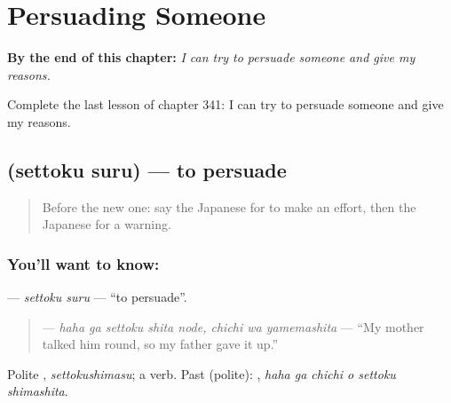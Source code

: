 
\chapter{Persuading Someone}
\label{ch:ja-persuading-someone}

\begin{chapteropening}
\textbf{By the end of this chapter:} \emph{I can try to persuade someone and give my reasons.}

Complete the last lesson of chapter 341: I can try to persuade someone and give my reasons.
\end{chapteropening}

\section[\texorpdfstring{\ja{せっとくする} (settoku suru)}{せっとくする (settoku suru)}]{ (settoku suru) — to persuade}

\label{lesson:JA-C341-settoku-suru}



\begin{quote}
Before the new one: say the Japanese for to make an effort, then the Japanese for a warning.
\end{quote}

\subsection*{You'll want to know: }
\textbf{} — \emph{settoku suru} — \textquotedblleft{}to persuade\textquotedblright{}.

\begin{quote}
\textbf{  } — \emph{haha ga settoku shita node, chichi wa yamemashita} — \textquotedblleft{}My mother talked him round, so my father gave it up.\textquotedblright{}
\end{quote}

Polite \textbf{}, \emph{settokushimasu}; a  verb. Past (polite): \textbf{  }, \emph{haha ga chichi o settoku shimashita}.

